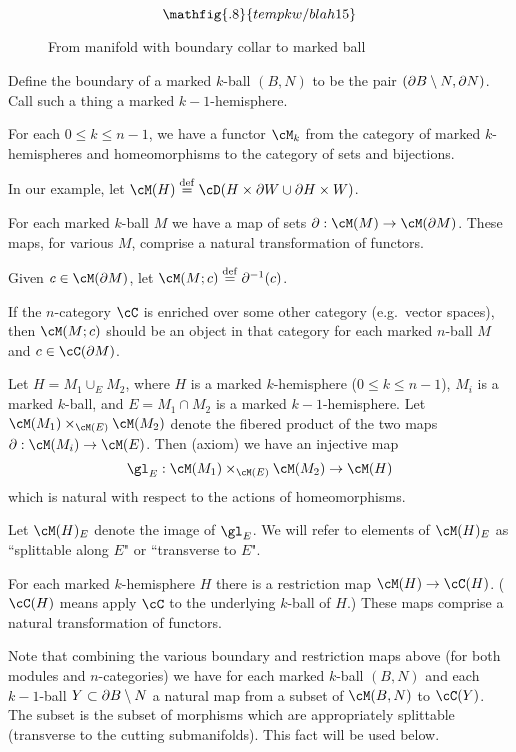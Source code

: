 \begin{figure}[!ht]
$$\mathfig{.8}{tempkw/blah15}$$
\caption{From manifold with boundary collar to marked ball}\label{blah15}\end{figure}

Define the boundary of a marked $k$-ball $(B, N)$ to be the pair $(\partial B \setminus N, \partial N)$.
Call such a thing a {marked $k{-}1$-hemisphere}.

{For each $0 \le k \le n-1$, we have a functor $\cM_k$ from 
the category of marked $k$-hemispheres and 
homeomorphisms to the category of sets and bijections.}

In our example, let $\cM(H) \deq \cD(H\times\bd W \cup \bd H\times W)$.

{For each marked $k$-ball $M$ we have a map of sets $\bd: \cM(M)\to \cM(\bd M)$.
These maps, for various $M$, comprise a natural transformation of functors.}

Given $c\in\cM(\bd M)$, let $\cM(M; c) \deq \bd^{-1}(c)$.

If the $n$-category $\cC$ is enriched over some other category (e.g.\ vector spaces),
then $\cM(M; c)$ should be an object in that category for each marked $n$-ball $M$
and $c\in \cC(\bd M)$.

{Let $H = M_1 \cup_E M_2$, where $H$ is a marked $k$-hemisphere ($0\le k\le n-1$),
$M_i$ is a marked $k$-ball, and $E = M_1\cap M_2$ is a marked $k{-}1$-hemisphere.
Let $\cM(M_1) \times_{\cM(E)} \cM(M_2)$ denote the fibered product of the 
two maps $\bd: \cM(M_i)\to \cM(E)$.
Then (axiom) we have an injective map
\[
	\gl_E : \cM(M_1) \times_{\cM(E)} \cM(M_2) \to \cM(H)
\]
which is natural with respect to the actions of homeomorphisms.}

Let $\cM(H)_E$ denote the image of $\gl_E$.
We will refer to elements of $\cM(H)_E$ as ``splittable along $E$" or ``transverse to $E$". 


{For each marked $k$-hemisphere $H$ there is a restriction map
$\cM(H)\to \cC(H)$.  
($\cC(H)$ means apply $\cC$ to the underlying $k$-ball of $H$.)
These maps comprise a natural transformation of functors.}

Note that combining the various boundary and restriction maps above
(for both modules and $n$-categories)
we have for each marked $k$-ball $(B, N)$ and each $k{-}1$-ball $Y\subset \partial B \setminus N$
a natural map from a subset of $\cM(B, N)$ to $\cC(Y)$.
The subset is the subset of morphisms which are appropriately splittable (transverse to the
cutting submanifolds).
This fact will be used below.

